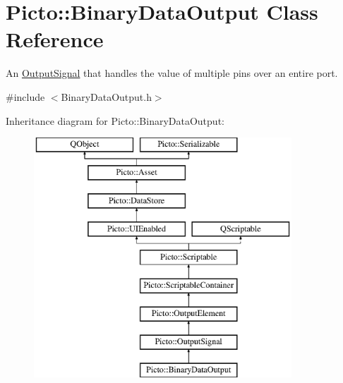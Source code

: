 \hypertarget{class_picto_1_1_binary_data_output}{\section{Picto\-:\-:Binary\-Data\-Output Class Reference}
\label{class_picto_1_1_binary_data_output}
}


An \hyperlink{struct_picto_1_1_output_signal}{Output\-Signal} that handles the value of multiple pins over an entire port.  




{\ttfamily \#include $<$Binary\-Data\-Output.\-h$>$}

Inheritance diagram for Picto\-:\-:Binary\-Data\-Output\-:\begin{figure}[H]
\begin{center}
\leavevmode
\includegraphics[height=9.000000cm]{class_picto_1_1_binary_data_output}
\end{center}
\end{figure}
